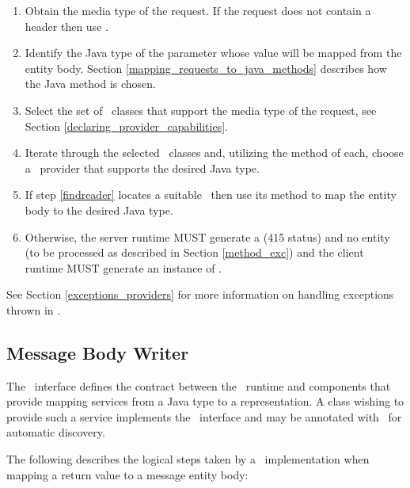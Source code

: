 \begin{enumerate}
\item Obtain the media type of the request. If the request does not contain a  header then use .
\item Identify the Java type of the parameter whose value will be mapped from the entity body. Section \ref{mapping_requests_to_java_methods} describes how the Java method is chosen.
\item Select the set of \MsgRead\ classes that support the media type of the request, see Section \ref{declaring_provider_capabilities}.
\item\label{findreader} Iterate through the selected \MsgRead\ classes and, utilizing the  method of each, choose a \MsgRead\ provider that supports the desired Java type.
\item If step \ref{findreader} locates a suitable \MsgRead\ then use its  method to map the entity body to the desired Java type.
\item Otherwise, the server runtime MUST generate a  (415 status) and no entity (to be processed as described in Section \ref{method_exc}) and the client runtime MUST generate an instance of .
\end{enumerate}

See Section \ref{exceptions_providers} for more information on handling exceptions thrown in \MsgRead{}.

\subsection{Message Body Writer}
\label{message_body_writer}

The \MsgWrite\ interface defines the contract between the \jaxrs\ runtime and components that provide mapping services from a Java type to a representation. A class wishing to provide such a service implements the \MsgWrite\ interface and may be annotated with \Provider\ for automatic discovery.

The following describes the logical steps taken by a \jaxrs\ implementation when mapping a return value to a message entity body:

